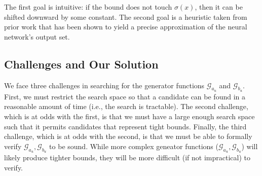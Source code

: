 The first goal is intuitive: if the bound does not touch $
\sigma(x) $, then it can be shifted downward by some constant. The second goal
is a heuristic taken from prior work that has been shown to yield a precise
approximation of the neural network's output set.


\subsection{Challenges and Our Solution}

We face three challenges in searching for the generator functions $
\mathcal{G}_{a_u}$ and $ \mathcal{G}_{b_u} $. First, we must restrict
the search space so that a candidate can be found in a reasonable amount of
time (i.e., the search is tractable). The second challenge, which is at odds
with the first, is that we must have a large enough search space such that it
permits candidates that represent tight bounds.
Finally, the
third challenge, which is at odds with the second, is that we must be able to
formally verify $ \mathcal{G}_{a_u}, \mathcal{G}_{b_u} $ to be sound. While
more complex geneator functions ($ \mathcal{G}_{a_u}, \mathcal{G}_{b_u} $) will
likely
produce tighter bounds, they will be more difficult (if not
impractical) to verify.

